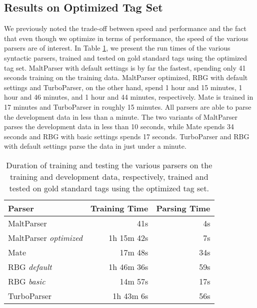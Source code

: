 \documentclass[a4paper,12pt,english]{book}
\begin{document}
\subsection{Results on Optimized Tag Set}
We previously noted the trade-off between speed and performance and the fact
that even though we optimize in terms of performance, the speed of the various
parsers are of interest. In Table \ref{optimizedtimeeval}, we present the run
times of the various syntactic parsers, trained and tested on gold standard
tags using the optimized tag set. MaltParser with default settings is by far
the fastest, spending only 41 seconds training on the training data.
MaltParser optimized, RBG with default settings and TurboParser, on the other
hand, spend 1 hour and 15 minutes, 1 hour and 46 minutes, and 1 hour and 44
minutes, respectively. Mate is trained in 17 minutes and TurboParser in roughly
15 minutes. All parsers are able to parse the development data in less than a
minute. The two variants of MaltParser parses the development data in less than
10 seconds, while Mate spends 34 seconds and RBG with basic settings spends 17
seconds. TurboParser and RBG with default settings parse the data in just
under a minute.

\begin{table}
    \centering
    \smaller[0.5]
    \begin{tabular}{@{}lrr@{}}
        \toprule
        \textbf{Parser} & \textbf{Training Time} & \textbf{Parsing Time} \\
        \midrule
        MaltParser & 41s & 4s \\
        MaltParser \emph{optimized} & 1h 15m 42s & 7s \\
        Mate & 17m 48s & 34s \\
        RBG \emph{default} & 1h 46m 36s & 59s \\
        RBG \emph{basic} & 14m 57s & 17s \\
        TurboParser & 1h 43m 6s & 56s \\
        \bottomrule
    \end{tabular}
    \caption{Duration of training and testing the various parsers on the
        training and development data, respectively, trained and tested on gold
        standard tags using the optimized tag set.}
    \label{optimizedtimeeval}
\end{table}
\end{document}
